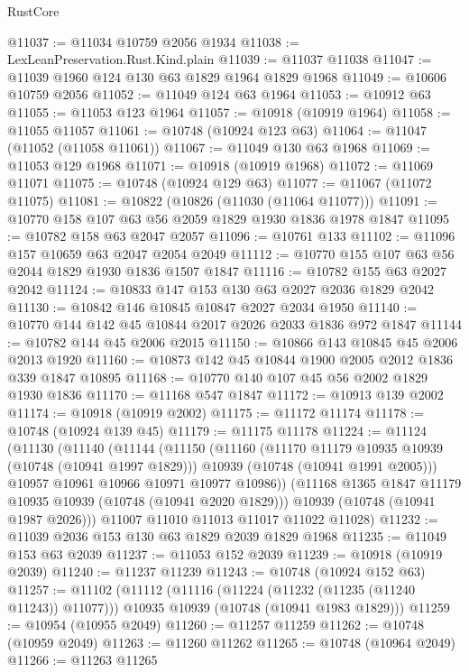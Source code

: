 \begin{lexlean}{RustCore}
\begin{coremodule}
@11037 := @11034 @10759 @2056 @1934
@11038 := LexLeanPreservation.Rust.Kind.plain
@11039 := @11037 @11038
@11047 := @11039 @1960 @124 @130 @63 @1829 @1964 @1829 @1968
@11049 := @10606 @10759 @2056
@11052 := @11049 @124 @63 @1964
@11053 := @10912 @63
@11055 := @11053 @123 @1964
@11057 := @10918 (@10919 @1964)
@11058 := @11055 @11057
@11061 := @10748 (@10924 @123 @63)
@11064 := @11047 (@11052 (@11058 @11061))
@11067 := @11049 @130 @63 @1968
@11069 := @11053 @129 @1968
@11071 := @10918 (@10919 @1968)
@11072 := @11069 @11071
@11075 := @10748 (@10924 @129 @63)
@11077 := @11067 (@11072 @11075)
@11081 := @10822 (@10826 (@11030 (@11064 @11077)))
@11091 := @10770 @158 @107 @63 @56 @2059 @1829 @1930 @1836 @1978 @1847
@11095 := @10782 @158 @63 @2047 @2057
@11096 := @10761 @133
@11102 := @11096 @157 @10659 @63 @2047 @2054 @2049
@11112 := @10770 @155 @107 @63 @56 @2044 @1829 @1930 @1836 @1507 @1847
@11116 := @10782 @155 @63 @2027 @2042
@11124 := @10833 @147 @153 @130 @63 @2027 @2036 @1829 @2042
@11130 := @10842 @146 @10845 @10847 @2027 @2034 @1950
@11140 := @10770 @144 @142 @45 @10844 @2017 @2026 @2033 @1836 @972 @1847
@11144 := @10782 @144 @45 @2006 @2015
@11150 := @10866 @143 @10845 @45 @2006 @2013 @1920
@11160 := @10873 @142 @45 @10844 @1900 @2005 @2012 @1836 @339 @1847 @10895
@11168 := @10770 @140 @107 @45 @56 @2002 @1829 @1930 @1836
@11170 := @11168 @547 @1847
@11172 := @10913 @139 @2002
@11174 := @10918 (@10919 @2002)
@11175 := @11172 @11174
@11178 := @10748 (@10924 @139 @45)
@11179 := @11175 @11178
@11224 := @11124
    (@11130
      (@11140
        (@11144
          (@11150
            (@11160
              (@11170 @11179 @10935 @10939 (@10748 (@10941 @1997 @1829)))
              @10939
              (@10748 (@10941 @1991 @2005)))
            @10957
            @10961
            @10966
            @10971
            @10977
            @10986))
        (@11168 @1365 @1847 @11179 @10935 @10939 (@10748 (@10941 @2020 @1829)))
        @10939
        (@10748 (@10941 @1987 @2026)))
      @11007
      @11010
      @11013
      @11017
      @11022
      @11028)
@11232 := @11039 @2036 @153 @130 @63 @1829 @2039 @1829 @1968
@11235 := @11049 @153 @63 @2039
@11237 := @11053 @152 @2039
@11239 := @10918 (@10919 @2039)
@11240 := @11237 @11239
@11243 := @10748 (@10924 @152 @63)
@11257 := @11102
    (@11112
      (@11116 (@11224 (@11232 (@11235 (@11240 @11243)) @11077)))
      @10935
      @10939
      (@10748 (@10941 @1983 @1829)))
@11259 := @10954 (@10955 @2049)
@11260 := @11257 @11259
@11262 := @10748 (@10959 @2049)
@11263 := @11260 @11262
@11265 := @10748 (@10964 @2049)
@11266 := @11263 @11265

\end{coremodule}
\end{lexlean}
